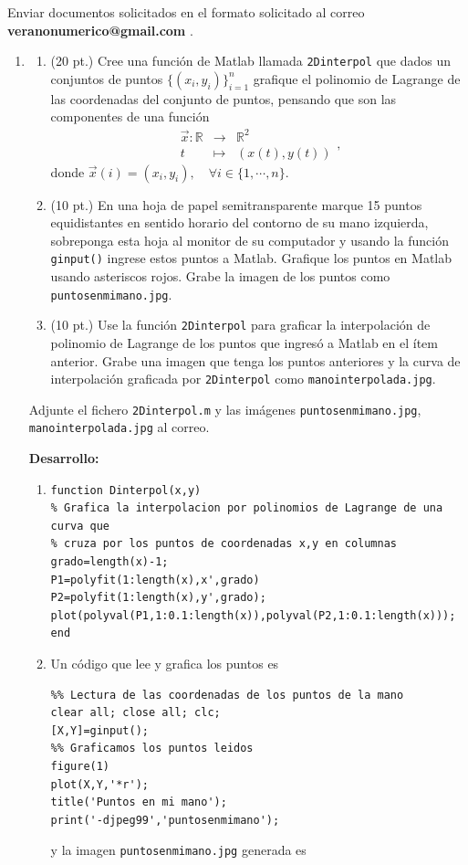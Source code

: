 \documentclass[11pt]{article}
\begin{document}
Enviar documentos solicitados en el formato solicitado al correo 
\textbf{veranonumerico@gmail.com} .
\begin{enumerate}
\item 
\begin{enumerate}
\item (20 pt.) Cree una funci\'on de Matlab llamada \texttt{2Dinterpol} que dados un conjuntos de puntos $\{(x_i,y_i)\}_{i=1}^n$ grafique el polinomio de Lagrange de las coordenadas del conjunto de puntos, pensando que son las componentes de una funci\'on
$$
\begin{array}{rcl}
\overrightarrow{x}:\mathbb{R}&\longrightarrow &\mathbb{R}^2\\
					t		& \longmapsto	& (x(t),y(t))	
\end{array},
$$
donde $\overrightarrow{x}(i)=(x_i,y_i), \quad \forall i\in\{1,\cdots,n\}$.

\item (10 pt.) En una hoja de papel semitransparente marque 15 puntos equidistantes en sentido horario del contorno de su mano izquierda, sobreponga esta hoja al monitor de su computador y usando la funci\'on \texttt{ginput()} ingrese estos puntos a Matlab. Grafique los puntos en Matlab usando asteriscos rojos. Grabe la imagen de los puntos como \texttt{puntosenmimano.jpg}.

\item (10 pt.) Use la funci\'on \texttt{2Dinterpol} para graficar la interpolaci\'on de polinomio de Lagrange de los puntos que ingres\'o a Matlab en el \'item anterior. Grabe una imagen que tenga los puntos anteriores y la curva de interpolaci\'on graficada por \texttt{2Dinterpol} como \texttt{manointerpolada.jpg}.
\end{enumerate}

Adjunte el fichero \texttt{2Dinterpol.m} y las im\'agenes \texttt{puntosenmimano.jpg}, \texttt{manointerpolada.jpg} al correo.

\textbf{Desarrollo:}
\begin{enumerate}
\item 
\begin{lstlisting}
function Dinterpol(x,y)
% Grafica la interpolacion por polinomios de Lagrange de una curva que 
% cruza por los puntos de coordenadas x,y en columnas
grado=length(x)-1;
P1=polyfit(1:length(x),x',grado)
P2=polyfit(1:length(x),y',grado);
plot(polyval(P1,1:0.1:length(x)),polyval(P2,1:0.1:length(x)));
end
\end{lstlisting}
%
\item Un c\'odigo que lee y grafica los puntos es
\begin{lstlisting}
%% Lectura de las coordenadas de los puntos de la mano
clear all; close all; clc;
[X,Y]=ginput();
%% Graficamos los puntos leidos
figure(1)
plot(X,Y,'*r');
title('Puntos en mi mano');
print('-djpeg99','puntosenmimano');
\end{lstlisting}
%
y la imagen \texttt{puntosenmimano.jpg} generada es


\end{enumerate}
\end{enumerate}
\end{document}
